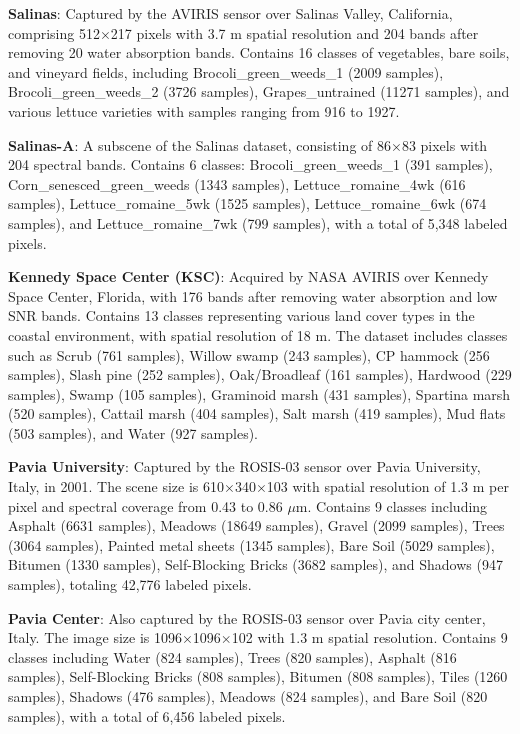 \documentclass[journal]{IEEEtran}
\begin{document}
\textbf{Salinas}: Captured by the AVIRIS sensor over Salinas Valley, California, comprising 512$\times$217 pixels with 3.7 m spatial resolution and 204 bands after removing 20 water absorption bands. Contains 16 classes of vegetables, bare soils, and vineyard fields, including Brocoli\_green\_weeds\_1 (2009 samples), Brocoli\_green\_weeds\_2 (3726 samples), Grapes\_untrained (11271 samples), and various lettuce varieties with samples ranging from 916 to 1927.

\textbf{Salinas-A}: A subscene of the Salinas dataset, consisting of 86$\times$83 pixels with 204 spectral bands. Contains 6 classes: Brocoli\_green\_weeds\_1 (391 samples), Corn\_senesced\_green\_weeds (1343 samples), Lettuce\_romaine\_4wk (616 samples), Lettuce\_romaine\_5wk (1525 samples), Lettuce\_romaine\_6wk (674 samples), and Lettuce\_romaine\_7wk (799 samples), with a total of 5,348 labeled pixels.

\textbf{Kennedy Space Center (KSC)}: Acquired by NASA AVIRIS over Kennedy Space Center, Florida, with 176 bands after removing water absorption and low SNR bands. Contains 13 classes representing various land cover types in the coastal environment, with spatial resolution of 18 m. The dataset includes classes such as Scrub (761 samples), Willow swamp (243 samples), CP hammock (256 samples), Slash pine (252 samples), Oak/Broadleaf (161 samples), Hardwood (229 samples), Swamp (105 samples), Graminoid marsh (431 samples), Spartina marsh (520 samples), Cattail marsh (404 samples), Salt marsh (419 samples), Mud flats (503 samples), and Water (927 samples).

\textbf{Pavia University}: Captured by the ROSIS-03 sensor over Pavia University, Italy, in 2001. The scene size is 610$\times$340$\times$103 with spatial resolution of 1.3 m per pixel and spectral coverage from 0.43 to 0.86 $\mu$m. Contains 9 classes including Asphalt (6631 samples), Meadows (18649 samples), Gravel (2099 samples), Trees (3064 samples), Painted metal sheets (1345 samples), Bare Soil (5029 samples), Bitumen (1330 samples), Self-Blocking Bricks (3682 samples), and Shadows (947 samples), totaling 42,776 labeled pixels.

\textbf{Pavia Center}: Also captured by the ROSIS-03 sensor over Pavia city center, Italy. The image size is 1096$\times$1096$\times$102 with 1.3 m spatial resolution. Contains 9 classes including Water (824 samples), Trees (820 samples), Asphalt (816 samples), Self-Blocking Bricks (808 samples), Bitumen (808 samples), Tiles (1260 samples), Shadows (476 samples), Meadows (824 samples), and Bare Soil (820 samples), with a total of 6,456 labeled pixels.
\end{document}
